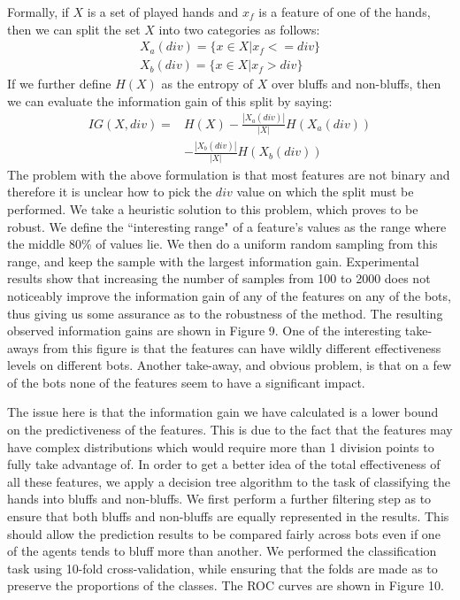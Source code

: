 \documentclass[letterpaper]{article}
\begin{document}
Formally, if $X$ is a set of played hands and $x_f$ is a feature of one of the hands, then we can split the set $X$ into two categories as follows: 
\begin{gather*}
X_a(div) = \{x \in X | x_f <= div\} \\
X_b(div) = \{x \in X | x_f > div\}
\end{gather*}
If we further define $H(X)$ as the entropy of $X$ over bluffs and non-bluffs, then we can evaluate the information gain of this split by saying: 
\begin{align*}
IG(X,div) = & H(X) - \frac{|X_a(div)|}{|X|} H(X_a(div)) \\
 & - \frac{|X_b(div)|}{|X|} H(X_b(div))
\end{align*}
The problem with the above formulation is that most features are not binary and therefore it is unclear how to pick the $div$ value on which the split must be performed. We take a heuristic solution to this problem, which proves to be robust. We define the ``interesting range" of a feature's values as the range where the middle 80\% of values lie. We then do a uniform random sampling from this range, and keep the sample with the largest information gain. Experimental results show that increasing the number of samples from 100 to 2000 does not noticeably improve the information gain of any of the features on any of the bots, thus giving us some assurance as to the robustness of the method. The resulting observed information gains are shown in Figure 9. One of the interesting take-aways from this figure is that the features can have wildly different effectiveness levels on different bots. Another take-away, and obvious problem, is that on a few of the bots none of the features seem to have a significant impact. 

The issue here is that the information gain we have calculated is a lower bound on the predictiveness of the features. This is due to the fact that the features may have complex distributions which would require more than 1 division points to fully take advantage of. In order to get a better idea of the total effectiveness of all these features, we apply a decision tree algorithm to the task of classifying the hands into bluffs and non-bluffs. We first perform a further filtering step as to ensure that both bluffs and non-bluffs are equally represented in the results. This should allow the prediction results to be compared fairly across bots even if one of the agents tends to bluff more than another. We performed the classification task using 10-fold cross-validation, while ensuring that the folds are made as to preserve the proportions of the classes. The ROC curves are shown in Figure 10.
\end{document}
